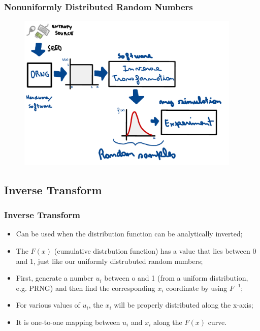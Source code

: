 \begin{frame}
    \frametitle{Nonuniformly Distributed Random Numbers}
    \begin{figure}
        \centering
        \includegraphics[width=0.95\textwidth]{sections/prng/figures/simulation_framework_plus.pdf}
    \end{figure}
\end{frame}

\subsection{Inverse Transform}

\begin{frame}
    \frametitle{Inverse Transform}
    
    \begin{itemize}

        \item Can be used when the distribution function can be analytically inverted;

        \item The $F(x)$ (cumulative distrbution function) has a value that lies 
        between 0 and 1, just like our uniformly distrubuted random numbers;

        \item First, generate a number $u_i$ between o and 1 
        (from a uniform distribution, e.g. PRNG) and then
        find the corresponding $x_i$ coordinate by using $F^{-1}$;

        \item For various values of $u_i$, the $x_i$ will 
        be properly distributed along the x-axis;

        \item It is one-to-one mapping between $u_i$ and $x_i$ along the $F(x)$ curve.
    \end{itemize}
\end{frame}



